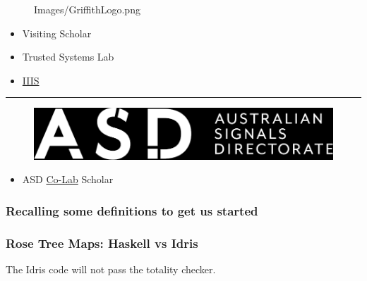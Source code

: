 \documentclass
  [hyperref={colorlinks = true,linkcolor = blue, 
             citecolor = blue, urlcolor = blue}
  ]{beamer}
\begin{document}
\begin{frame}[fragile]
\begin{minipage}{0.5\linewidth}
\begin{figure}[h]
        {Images/GriffithLogo.png}
    \end{figure}
  \end{minipage}
  \hfill
  \begin{minipage}{0.45\linewidth}
  \begin{itemize}
    \item Visiting Scholar
    \item Trusted Systems Lab
    \item \href{https://www.griffith.edu.au/institute-integrated-intelligent-systems}{IIIS}
  \end{itemize}
  \end{minipage}
\hrule
  \begin{minipage}{0.5\linewidth}
    \begin{figure}[h]
      \includegraphics[width=\linewidth]
        {Images/asd-logo.png}
    \end{figure}
  \end{minipage}
  \hfill
  \begin{minipage}{0.45\linewidth}
  \begin{itemize}
    \item ASD 
      \href{https://www.asd.gov.au/about/asd-anu-co-lab}{Co-Lab} 
      Scholar
  \end{itemize}
  \end{minipage}
\end{frame}

\begin{frame}[fragile]
  \frametitle{Recalling some definitions to get us started}
\end{frame}

\begin{frame}[fragile]
  \frametitle{Rose Tree Maps: Haskell vs Idris}
  The Idris code will not pass the totality checker.
  \begin{minipage}{0.44\linewidth}
    \inputminted{haskell}{../Code/src/HaskellRose.hs}
  \end{minipage}
  $\;$
  \vline
  $\;$
  \begin{minipage}{0.5\linewidth}
    \inputminted{idris}{../Code/src/IdrisRoseBad.idr}
  \end{minipage}
\end{frame}
\end{document}

